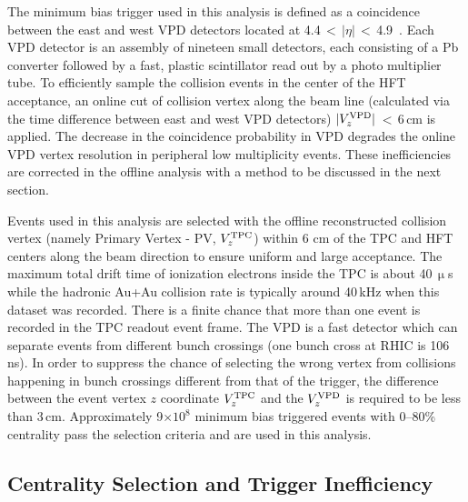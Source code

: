 \documentclass[%
 reprint,	
 amsmath,amssymb,
 aps,
 prc,
]{revtex4-1}
\begin{document}
The minimum bias trigger used in this analysis is defined as a coincidence between the east and west VPD detectors located at 4.4\,$<$\,$|\eta|$\,$<$\,4.9~\cite{VPD}. Each VPD detector is an assembly of nineteen small detectors, each consisting of a Pb converter followed by a fast, plastic scintillator read out by a photo multiplier tube. To efficiently sample the collision events in the center of the HFT acceptance, an online cut of collision vertex along the beam line (calculated via the time difference between east and west VPD detectors) $|V_z^{\rm VPD}|$\,$<$\,6\,cm is applied. 
The decrease in the coincidence probability in VPD degrades the online VPD vertex resolution in peripheral low multiplicity events. These inefficiencies are corrected in the offline analysis with a method to be discussed in the next section. %

Events used in this analysis are selected with
the offline reconstructed collision vertex (namely Primary Vertex - PV, $V_{z}^{\rm TPC}$) within 6 cm of the TPC and HFT centers along the beam direction to ensure uniform and large acceptance. The maximum total drift time of ionization electrons inside the TPC is about 40\,$\upmu$s while the hadronic Au+Au collision rate is typically around 40\,kHz when this dataset was recorded. There is a finite chance that more than one event is recorded in the TPC readout event frame. The VPD is a fast detector which can separate events from different bunch crossings (one bunch cross at RHIC is 106\,ns). In order to suppress the chance of selecting the wrong vertex from collisions happening in bunch crossings different from that of the trigger, the difference between the event vertex $z$ coordinate $V_{z}^{\rm TPC}$ and the $V_{z}^{\rm VPD}$ is required to be less than 3\,cm. Approximately 9$\times 10^{8}$ minimum bias triggered events with 0--80\% centrality pass the selection criteria and are used in this analysis.

\subsection{Centrality Selection and Trigger Inefficiency}
\label{dataset:Centrality}
\end{document}

